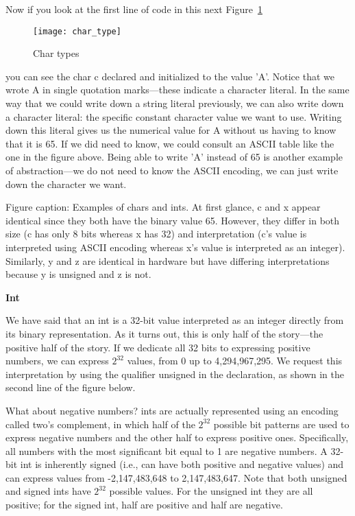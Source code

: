 \documentclass[11pt, a4paper]{article}
\begin{document}
Now if you look at the first line of code in this next Figure~\ref{fig:char_types}


\begin{figure}[htpb]
  \centering
  \texttt{[image: char\_type]}
  \caption{Char types}
  \label{fig:char_types}
\end{figure}



you can see the char c declared and initialized to the value 'A'. Notice that we wrote A in single quotation marks—these indicate a character literal. In the same way that we could write down a string literal previously, we can also write down a character literal: the specific constant character value we want to use. Writing down this literal gives us the numerical value for A without us having to know that it is 65. If we did need to know, we could consult an ASCII table like the one in the figure above. Being able to write 'A' instead of 65 is another example of abstraction—we do not need to know the ASCII encoding, we can just write down the character we want.

Figure caption: Examples of chars and ints. At first glance, c and x appear identical since they both have the binary value 65. However, they differ in both size (c has only 8 bits whereas x has 32) and interpretation (c’s value is interpreted using ASCII encoding whereas x’s value is interpreted as an integer). Similarly, y and z are identical in hardware but have differing interpretations because y is unsigned and z is not.




\textbf{Int}


We have said that an int is a 32-bit value interpreted as an integer directly from its binary representation. As it turns out, this is only half of the story—the positive half of the story. If we dedicate all 32 bits to expressing positive numbers, we can express $2^{32}$ values, from 0 up to 4,294,967,295. We request this interpretation by using the qualifier unsigned in the declaration, as shown in the second line of the figure below.

What about negative numbers? ints are actually represented using an encoding called two’s complement, in which half of the $2^{32}$ possible bit patterns are used to express negative numbers and the other half to express positive ones. Specifically, all numbers with the most significant bit equal to 1 are negative numbers. A 32-bit int is inherently signed (i.e., can have both positive and negative values) and can express values from -2,147,483,648 to 2,147,483,647. Note that both unsigned and signed ints have $2^{32}$ possible values. For the unsigned int they are all positive; for the signed int, half are positive and half are negative.
\end{document}
